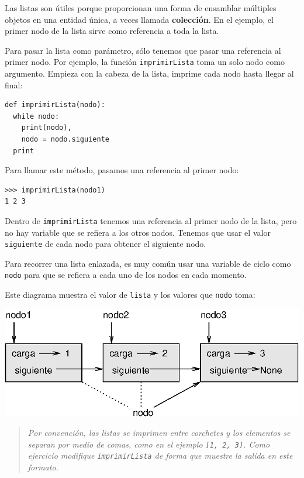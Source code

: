 
Las listas son útiles porque proporcionan una forma de ensamblar múltiples
objetos en una entidad única, a veces llamada \textbf{colección}.
En el ejemplo, el primer nodo de la lista sirve como referencia a
toda la lista.

 

Para pasar la lista como parámetro, sólo tenemos que pasar una referencia
al primer nodo. Por ejemplo, la función \texttt{imprimirLista} toma
un solo nodo como argumento. Empieza con la cabeza de la lista, imprime
cada nodo hasta llegar al final:

\beforeverb 
\begin{verbatim}
def imprimirLista(nodo):
  while nodo:
    print(nodo),
    nodo = nodo.siguiente
  print
\end{verbatim}
\afterverb Para llamar este método, pasamos una referencia al primer
nodo:

\beforeverb 
\begin{verbatim}
>>> imprimirLista(nodo1)
1 2 3
\end{verbatim}
\afterverb Dentro de \texttt{imprimirLista} tenemos una referencia
al primer nodo de la lista, pero no hay variable que se refiera a
los otros nodos. Tenemos que usar el valor \texttt{siguiente} de cada
nodo para obtener el siguiente nodo.

Para recorrer una lista enlazada, es muy común usar una variable de
ciclo como \texttt{nodo} para que se refiera a cada uno de los nodos
en cada momento.

  

Este diagrama muestra el valor de \texttt{lista} y los valores que
\texttt{nodo} toma:

\beforefig \centerline{\includegraphics{illustrations/link3}}
\afterfig
\begin{quote}
{\em Por convención, las listas se imprimen entre corchetes y los
elementos se separan por medio de comas, como en el ejemplo \texttt{{[}1,
2, 3{]}}. Como ejercicio modifique \texttt{imprimirLista} de forma
que muestre la salida en este formato.} 
\end{quote}

